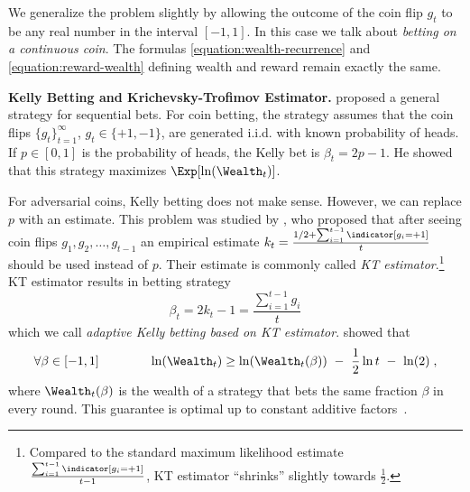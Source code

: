We generalize the problem slightly by allowing the outcome of the coin flip
$g_t$ to be any real number in the interval $[-1,1]$. In this case we talk about
\emph{betting on a continuous coin}. The formulas
\eqref{equation:wealth-recurrence} and \eqref{equation:reward-wealth} defining
wealth and reward remain exactly the same.

\noindent\textbf{Kelly Betting and Krichevsky-Trofimov Estimator.} \citet{Kelly56} proposed a general strategy for sequential bets. For coin
betting, the strategy assumes that the coin flips $\{g_t\}_{t=1}^\infty$, $g_t
\in \{+1,-1\}$, are generated i.i.d. with known probability of heads. If $p \in
[0,1]$ is the probability of heads, the Kelly bet is
$
\beta_t = 2p - 1
$.
He showed that this strategy maximizes $\Exp[\ln(\Wealth_t)]$.

For adversarial coins, Kelly betting does not make sense. However, we can
replace $p$ with an estimate. This problem was studied by \citet{KrichevskyT81},
who proposed that after seeing coin flips $g_1, g_2, \dots, g_{t-1}$ an
empirical estimate $k_t = \frac{1/2 + \sum_{i=1}^{t-1} \indicator[g_i = +1]}{t}$
should be used instead of $p$. Their estimate is commonly called \emph{KT
estimator}.\footnote{Compared to the standard maximum likelihood estimate
$\frac{\sum_{i=1}^{t-1} \indicator[g_i = +1]}{t-1}$, KT estimator ``shrinks''
slightly towards $\frac{1}{2}$.} KT estimator results in betting strategy
\begin{equation}
\label{equation:kt-estimator-betting-strategy}
\beta_t = 2k_t - 1 = \frac{\sum_{i=1}^{t-1} g_i}{t}
\end{equation}
which we call \emph{adaptive Kelly betting based on KT estimator}.
\citeauthor{KrichevskyT81} showed that
$$
\forall \beta \in [-1,1] \qquad \qquad \ln(\Wealth_t) \ge \ln(\Wealth_t(\beta)) \ - \ \frac{1}{2} \ln t \ - \ \ln(2) \; ,
$$
where $\Wealth_t(\beta)$ is the wealth of a strategy that bets the same fraction
$\beta$ in every round. This guarantee is optimal up to constant additive factors~\citep{Cesa-BianchiL06}.
